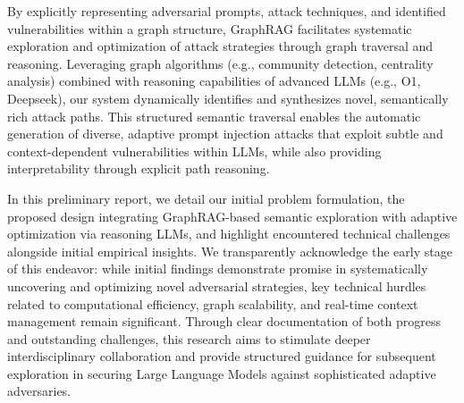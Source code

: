 \documentclass[manuscript,screen,review]{acmart}
\begin{document}

By explicitly representing adversarial prompts, attack techniques, and identified vulnerabilities within a graph structure, GraphRAG facilitates systematic exploration and optimization of attack strategies through graph traversal and reasoning. Leveraging graph algorithms (e.g., community detection, centrality analysis) combined with reasoning capabilities of advanced LLMs (e.g., O1, Deepseek), our system dynamically identifies and synthesizes novel, semantically rich attack paths. This structured semantic traversal enables the automatic generation of diverse, adaptive prompt injection attacks that exploit subtle and context-dependent vulnerabilities within LLMs, while also providing interpretability through explicit path reasoning.

In this preliminary report, we detail our initial problem formulation, the proposed design integrating GraphRAG-based semantic exploration with adaptive optimization via reasoning LLMs, and highlight encountered technical challenges alongside initial empirical insights. We transparently acknowledge the early stage of this endeavor: while initial findings demonstrate promise in systematically uncovering and optimizing novel adversarial strategies, key technical hurdles related to computational efficiency, graph scalability, and real-time context management remain significant. Through clear documentation of both progress and outstanding challenges, this research aims to stimulate deeper interdisciplinary collaboration and provide structured guidance for subsequent exploration in securing Large Language Models against sophisticated adaptive adversaries.
\end{document}
